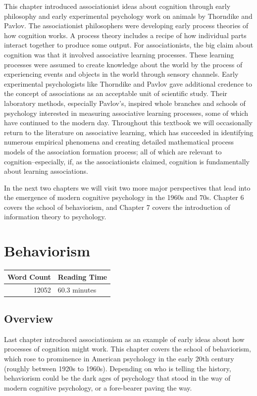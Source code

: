\documentclass[
  oneside,
  12pt]{crumpbook}
\begin{document}
This chapter introduced associationist ideas about cognition through early philosophy and early experimental psychology work on animals by Thorndike and Pavlov. The associationist philosophers were developing early process theories of how cognition works. A process theory includes a recipe of how individual parts interact together to produce some output. For associationists, the big claim about cognition was that it involved associative learning processes. These learning processes were assumed to create knowledge about the world by the process of experiencing events and objects in the world through sensory channels. Early experimental psychologists like Thorndike and Pavlov gave additional credence to the concept of associations as an acceptable unit of scientific study. Their laboratory methods, especially Pavlov's, inspired whole branches and schools of psychology interested in measuring associative learning processes, some of which have continued to the modern day. Throughout this textbook we will occasionally return to the literature on associative learning, which has succeeded in identifying numerous empirical phenomena and creating detailed mathematical process models of the association formation process; all of which are relevant to cognition--especially, if, as the associationists claimed, cognition is fundamentally about learning associations.

In the next two chapters we will visit two more major perspectives that lead into the emergence of modern cognitive psychology in the 1960s and 70s. Chapter 6 covers the school of behaviorism, and Chapter 7 covers the introduction of information theory to psychology.

\hypertarget{behaviorism}{%
\chapter{Behaviorism}\label{behaviorism}}

\begin{tabular}{r|l}
\hline
Word Count & Reading Time\\
\hline
12052 & 60.3 minutes\\
\hline
\end{tabular}

\hypertarget{overview}{%
\section{Overview}\label{overview}}

Last chapter introduced associationism as an example of early ideas about how processes of cognition might work. This chapter covers the school of behaviorism, which rose to prominence in American psychology in the early 20th century (roughly between 1920s to 1960s). Depending on who is telling the history, behaviorism could be the dark ages of psychology that stood in the way of modern cognitive psychology, or a fore-bearer paving the way.
\end{document}
